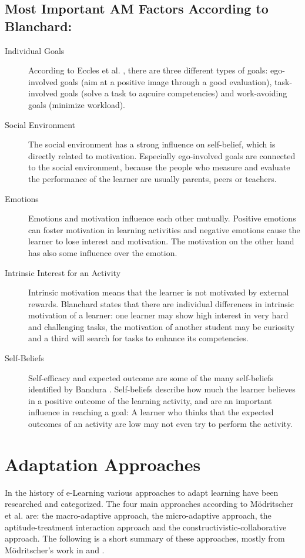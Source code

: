\subsection{Most Important AM Factors According to Blanchard:}
\begin{description}
\item[Individual Goals] According to Eccles et al. \cite{Eccles1998}, there
are three different types of goals: ego-involved goals (aim at a positive
image through a good evaluation), task-involved goals (solve a task to aqcuire
competencies) and work-avoiding goals (minimize workload).
\item[Social Environment] The social environment has a strong influence on
self-belief, which is directly related to motivation. Especially ego-involved
goals are connected to the social environment, because the people who measure
and evaluate the performance of the learner are usually parents, peers or
teachers.
\item[Emotions] Emotions and motivation influence each other mutually.
Positive emotions can foster motivation in learning activities and negative
emotions cause the learner to lose interest and motivation. The
motivation on the other hand has also some influence over the emotion.
\item[Intrinsic Interest for an Activity] Intrinsic motivation means that the
learner is not motivated by external rewards. Blanchard states that there are
individual differences in intrinsic motivation of a learner: one learner may
show high interest in very hard and challenging tasks, the motivation of
another student may be curiosity and a third will search for tasks to enhance
its competencies.
\item[Self-Beliefs] Self-efficacy and expected outcome are some of the many
self-beliefs identified by Bandura \cite{Bandura1977a}. Self-beliefs describe
how much the learner believes in a positive outcome of the learning activity,
and are an important influence in reaching a goal: A learner who thinks that
the expected outcomes of an activity are low may not even try to perform the
activity.
\end{description}

\section{Adaptation Approaches}
\label{adaptation}
In the history of e-Learning various approaches to adapt learning have been
researched and categorized. The four main approaches according to
M\"{o}dritscher et al. \cite{Modritscher2004} are: the macro-adaptive approach, the
micro-adaptive approach, the aptitude-treatment interaction approach and
the constructivistic-collaborative approach. The following is a short summary of
these approaches, mostly from M\"{o}dritscher's work in \cite{Modritscher2004}
and \cite{Modritscher2006a}.

